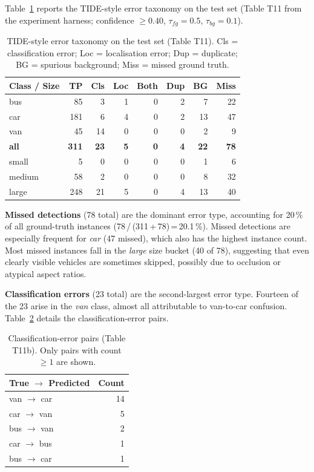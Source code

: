 Table~\ref{tab:tide} reports the TIDE-style error taxonomy on the test set
(Table T11 from the experiment harness; confidence $\ge 0.40$,
$\tau_{fg}=0.5$, $\tau_{bg}=0.1$).

\begin{table}[htbp]
\centering
\caption{TIDE-style error taxonomy on the test set (Table T11).
  Cls = classification error; Loc = localisation error; Dup = duplicate;
  BG = spurious background; Miss = missed ground truth.}
\label{tab:tide}
\begin{tabular}{lrrrrrrr}
\toprule
Class / Size & TP & Cls & Loc & Both & Dup & BG & Miss \\
\midrule
bus          &  85 &  3 &  1 & 0 & 2 &  7 & 22 \\
car          & 181 &  6 &  4 & 0 & 2 & 13 & 47 \\
van          &  45 & 14 &  0 & 0 & 0 &  2 &  9 \\
\textbf{all} & \textbf{311} & \textbf{23} & \textbf{5} & \textbf{0} & \textbf{4} & \textbf{22} & \textbf{78} \\
\midrule
small        &  5 & 0 & 0 & 0 & 0 &  1 &  6 \\
medium       & 58 & 2 & 0 & 0 & 0 &  8 & 32 \\
large        &248 &21 & 5 & 0 & 4 & 13 & 40 \\
\bottomrule
\end{tabular}
\end{table}

\textbf{Missed detections} (78 total) are the dominant error type,
accounting for 20\,\% of all ground-truth instances
(78\,/\,(311\,+\,78)\,=\,20.1\,\%).
Missed detections are especially frequent for \textit{car} (47 missed),
which also has the highest instance count.
Most missed instances fall in the \textit{large} size bucket (40 of 78),
suggesting that even clearly visible vehicles are sometimes skipped,
possibly due to occlusion or atypical aspect ratios.

\textbf{Classification errors} (23 total) are the second-largest error
type. Fourteen of the 23 arise in the \textit{van} class, almost all
attributable to van-to-car confusion.
Table~\ref{tab:confusion-pairs} details the classification-error pairs.

\begin{table}[htbp]
\centering
\caption{Classification-error pairs (Table T11b). Only pairs with count
  $\ge 1$ are shown.}
\label{tab:confusion-pairs}
\begin{tabular}{lr}
\toprule
True $\rightarrow$ Predicted & Count \\
\midrule
van $\rightarrow$ car  & 14 \\
car $\rightarrow$ van  &  5 \\
bus $\rightarrow$ van  &  2 \\
car $\rightarrow$ bus  &  1 \\
bus $\rightarrow$ car  &  1 \\
\bottomrule
\end{tabular}
\end{table}

